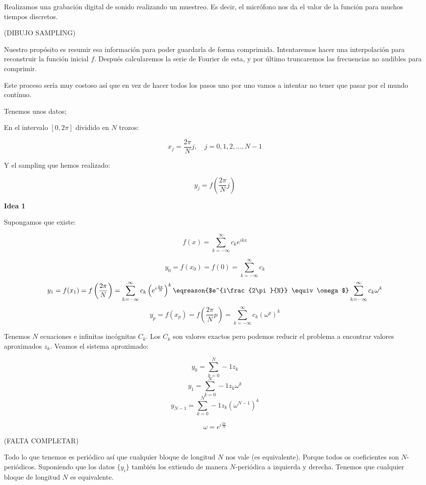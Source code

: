 			Realizamos una grabación digital de sonido realizando un muestreo. Es decir, el micrófono nos da el valor de la función para muchos tiempos discretos.

			(DIBUJO SAMPLING)

			Nuestro propósito es resumir esa información para poder guardarla de forma comprimida. Intentaremos hacer una interpolación para reconstruir la función inicial $f$. Después calcularemos la serie de Fourier de esta, y por último truncaremos las frecuencias no audibles para comprimir.

			Este proceso sería muy costoso así que en vez de hacer todos los pasos uno por uno vamos a intentar no tener que pasar por el mundo contínuo.

			Tenemos unos datos;

			En el intervalo $[0,2\pi]$ dividido en $N$ trozos:

			\[x_j = \frac{2\pi}{N}j, \quad j=0,1,2,…,N-1\]

			Y el sampling que hemos realizado:

			\[ y_j = f(\frac{2\pi}{N}j)\]


			\textbf{Idea 1}

			Supongamos que existe:

			\[f(x) = \sum_{k=-\infty}^\infty c_k e^{ikx} \]

			\[ y_0 = f(x_0) = f(0) = \sum_{k=-\infty}^\infty c_k \]
			\[ y_1 = f(x_1) = f\left(\frac{2\pi}{N}\right) = \sum_{k=-\infty}^\infty c_k \left( e^{i\frac{2\pi}{N}} \right)^k \eqreason{$e^{i\frac{2\pi}{N}} \equiv \omega $} \sum_{k=-\infty}^\infty c_k \omega^k \]
			\[ y_p = f(x_p) = f\left(\frac{2\pi}{N}p\right) = \sum_{k=-\infty}^\infty c_k \left(\omega^p\right)^k \]



			Tenemos $N$ ecuaciones e infinitas incógnitas $C_k$. Los $C_k$ son valores exactos pero podemos reducir el problema a encontrar valores aproximados $z_k$. Veamos el sistema aproximado:

			\[y_0 = \sum_{k=0}^N-1 z_k\]
			\[y_1 = \sum_{k=0}^N-1 z_k \omega^k\]
			\[y_{N-1} = \sum_{k=0}^N-1 z_k \left(\omega^{N-1}\right)^k\]


			\obs
			\[ \omega = e^{i \frac{2\pi}{N}}  \]

			(FALTA COMPLETAR)


			Todo lo que tenemos es periódico así que cualquier bloque de longitud $N$ nos vale (es equivalente). Porque todos os coeficientes son $N$-periódicos. Suponiendo que los datos $\{y_i\}$ también los extiendo de manera $N$-periódica a izquierda y derecha. Tenemos que cualquier bloque de longitud $N$ es equivalente.

